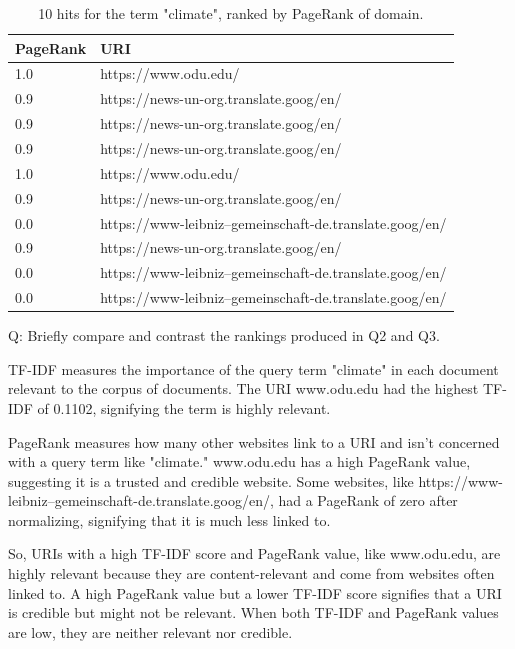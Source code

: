 \documentclass[12pt]{article}
\begin{document}
\begin{table}[h]
\centering
\caption{10 hits for the term "climate", ranked by PageRank of domain.}
\label{tbl:simple}
\begin{tabular}{|l|l|}
\hline
\textbf{PageRank} & \textbf{URI} \\ \hline \hline
1.0 & https://www.odu.edu/ \\ \hline
0.9 & https://news-un-org.translate.goog/en/ \\ \hline
0.9 & https://news-un-org.translate.goog/en/ \\ \hline
0.9 & https://news-un-org.translate.goog/en/ \\ \hline
1.0 & https://www.odu.edu/ \\ \hline
0.9 & https://news-un-org.translate.goog/en/ \\ \hline
0.0 & https://www-leibniz--gemeinschaft-de.translate.goog/en/ \\ \hline
0.9 & https://news-un-org.translate.goog/en/ \\ \hline
0.0 & https://www-leibniz--gemeinschaft-de.translate.goog/en/ \\ \hline
0.0 & https://www-leibniz--gemeinschaft-de.translate.goog/en/ \\ \hline

\end{tabular}
\end{table}

Q: Briefly compare and contrast the rankings produced in Q2 and Q3.

TF-IDF measures the importance of the query term "climate" in each document relevant to the corpus of documents. The URI www.odu.edu had the highest TF-IDF of 0.1102, signifying the term is highly relevant.

PageRank measures how many other websites link to a URI and isn't concerned with a query term like "climate." www.odu.edu has a high PageRank value, suggesting it is a trusted and credible website. Some websites, like https://www-leibniz–gemeinschaft-de.translate.goog/en/, had a PageRank of zero after normalizing, signifying that it is much less linked to.

So, URIs with a high TF-IDF score and PageRank value, like www.odu.edu, are highly relevant because they are content-relevant and come from websites often linked to. A high PageRank value but a lower TF-IDF score signifies that a URI is credible but might not be relevant. When both TF-IDF and PageRank values are low, they are neither relevant nor credible.
\end{document}
